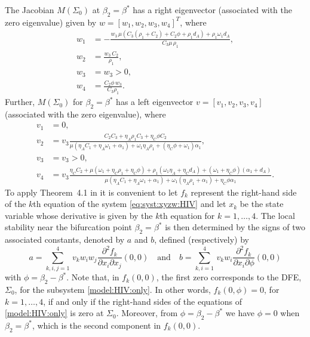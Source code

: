 \documentclass{my_aims}
\theoremstyle{definition}
\begin{document}
The Jacobian $M(\Sigma_0)$ at $\beta_2 = \beta^*$ has a right eigenvector
(associated with the zero eigenvalue) given by $w = [w_1, w_2, w_3, w_4]^T$, where
\begin{equation*}
\begin{split}
w_1&=-{\frac{w_3 \, \mu(C_3(\rho_1+C_2)+C_2\phi+\rho_1 d_A)
+\rho_1 \omega_1 d_A }{C_3 \mu\,\rho_1}},\\
w_2&= {\frac{w_3\, C_2 }{\rho_1}},\\
w_3&= w_3 > 0,\\
w_4&= {\frac {C_2  \phi\, w_3}{C_3 \rho_1 }}.
\end{split}
\end{equation*}
Further, $M(\Sigma_{0})$ for $\beta_2 = \beta^*$ has a left eigenvector
$v = [v_1, v_2, v_3, v_4]$ (associated with the zero eigenvalue), where
\begin{equation*}
\begin{split}
v_1&=0,\\
v_2&= v_3 {\frac { C_2 C_3 +\eta_A \rho_1 C_3 +\eta_C \phi C_2}
{\mu (\eta_A C_1+ \eta_A  \omega_1+ \alpha_1)+\omega_1 \eta_A \rho_1
+ (\eta_C \phi + \omega_1)\alpha_1}},\\
v_3&= v_3 > 0, \\
v_4&= v_3 {\frac { \eta_C C_2
+ \mu (\omega_1 +\eta_C  \rho_1 +\eta_ C \phi) + \rho_1(\omega_1 \eta_A
+\eta_C d_A)  + (\omega_1 +\eta_C \phi)(\alpha_1 + d_A)}{\mu
\left(\eta_A C_1 +\eta_A  \omega_1 +  \alpha_1\right)
+\omega_1 (\eta_A \rho_1 + \alpha_1) +\eta_C \phi \alpha_1}}.
\end{split}
\end{equation*}
To apply Theorem~4.1 in \cite{CChavez_Song_2004} it is convenient to let
$f_k$ represent the right-hand side of the $k$th equation of the system
\eqref{eq:syst:xyzw:HIV} and let $x_k$ be the state variable whose derivative
is given by the $k$th equation for $k = 1, \ldots, 4$. The local stability
near the bifurcation point $\beta_2 = \beta^*$ is then determined by the
signs of two associated constants, denoted by $a$ and $b$, defined (respectively) by
\begin{equation*}
a = \sum_{k, i, j=1}^4 \, v_k w_i w_j \frac{\partial^2 f_k}{\partial x_i \partial x_j}(0, 0)
\quad \text{and} \quad b = \sum_{k, i =1}^4 \, v_k w_i
\frac{\partial^2 f_k}{\partial x_i \partial \phi}(0, 0)
\end{equation*}
with $\phi = \beta_2 - \beta^*$. Note that, in $f_k(0, 0)$, the first zero corresponds to the DFE,
$\Sigma_0$, for the subsystem \eqref{model:HIV:only}. In other words, $f_k(0, \phi) = 0$,
for $k=1, \ldots, 4$, if and only if the right-hand sides of the equations of \eqref{model:HIV:only}
is zero at $\Sigma_0$. Moreover, from $\phi = \beta_2 - \beta^*$ we have $\phi = 0$
when $\beta_2 = \beta^*$, which is the second component in $f_k(0, 0)$.
\end{document}

